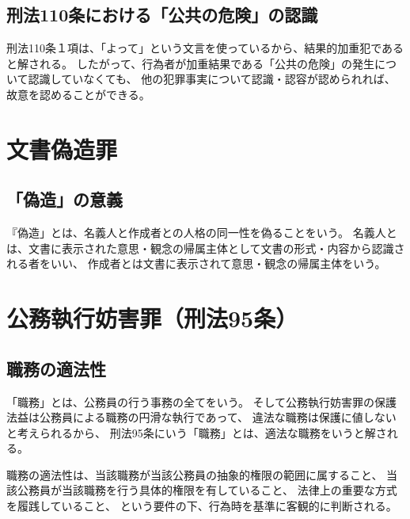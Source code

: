 \documentclass[11pt]{jsarticle}
\begin{document}
		\subsection{刑法110条における「公共の危険」の認識}
			刑法110条１項は、「よって」という文言を使っているから、結果的加重犯であると解される。
			したがって、行為者が加重結果である「公共の危険」の発生について認識していなくても、
			他の犯罪事実について認識・認容が認められれば、故意を認めることができる。
		
		
	\section{文書偽造罪}
		\subsection{「偽造」の意義}
			『偽造」とは、名義人と作成者との人格の同一性を偽ることをいう。
			名義人とは、文書に表示された意思・観念の帰属主体として文書の形式・内容から認識される者をいい、
			作成者とは文書に表示されて意思・観念の帰属主体をいう。
			
	
			
	\section{公務執行妨害罪（刑法95条）}
		\subsection{職務の適法性}
			「職務」とは、公務員の行う事務の全てをいう。
			そして公務執行妨害罪の保護法益は公務員による職務の円滑な執行であって、
			違法な職務は保護に値しないと考えられるから、
			刑法95条にいう「職務」とは、適法な職務をいうと解される。
			
			職務の適法性は、当該職務が当該公務員の抽象的権限の範囲に属すること、
			当該公務員が当該職務を行う具体的権限を有していること、
			法律上の重要な方式を履践していること、
			という要件の下、行為時を基準に客観的に判断される。
		
	
	
		
		
		
	






	
\end{document}
